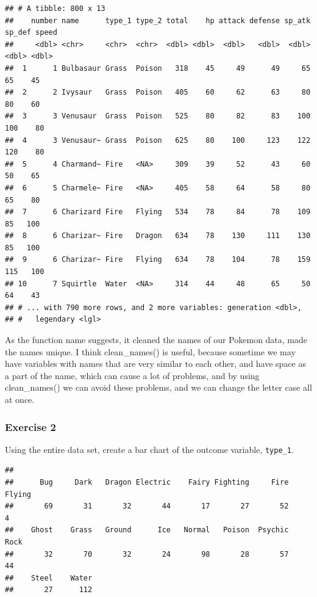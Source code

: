 \documentclass[
]{article}
\newenvironment{Shaded}{\begin{snugshade}}{\end{snugshade}}
\newcommand{\FunctionTok}[1]{\textcolor[rgb]{0.00,0.00,0.00}{#1}}
\newcommand{\NormalTok}[1]{#1}
\newcommand{\OtherTok}[1]{\textcolor[rgb]{0.56,0.35,0.01}{#1}}
\newcommand{\SpecialCharTok}[1]{\textcolor[rgb]{0.00,0.00,0.00}{#1}}
\begin{document}
\begin{verbatim}
## # A tibble: 800 x 13
##    number name      type_1 type_2 total    hp attack defense sp_atk sp_def speed
##     <dbl> <chr>     <chr>  <chr>  <dbl> <dbl>  <dbl>   <dbl>  <dbl>  <dbl> <dbl>
##  1      1 Bulbasaur Grass  Poison   318    45     49      49     65     65    45
##  2      2 Ivysaur   Grass  Poison   405    60     62      63     80     80    60
##  3      3 Venusaur  Grass  Poison   525    80     82      83    100    100    80
##  4      3 Venusaur~ Grass  Poison   625    80    100     123    122    120    80
##  5      4 Charmand~ Fire   <NA>     309    39     52      43     60     50    65
##  6      5 Charmele~ Fire   <NA>     405    58     64      58     80     65    80
##  7      6 Charizard Fire   Flying   534    78     84      78    109     85   100
##  8      6 Charizar~ Fire   Dragon   634    78    130     111    130     85   100
##  9      6 Charizar~ Fire   Flying   634    78    104      78    159    115   100
## 10      7 Squirtle  Water  <NA>     314    44     48      65     50     64    43
## # ... with 790 more rows, and 2 more variables: generation <dbl>,
## #   legendary <lgl>
\end{verbatim}

As the function name suggests, it cleaned the names of our Pokemon data,
made the names unique. I think clean\_names() is useful, because
sometime we may have variables with names that are very similar to each
other, and have space as a part of the name, which can cause a lot of
problems, and by using clean\_names() we can avoid these problems, and
we can change the letter case all at once.

\hypertarget{exercise-2}{%
\subsubsection{Exercise 2}\label{exercise-2}}

Using the entire data set, create a bar chart of the outcome variable,
\texttt{type\_1}.

\begin{Shaded}
\end{Shaded}

\begin{verbatim}
## 
##      Bug     Dark   Dragon Electric    Fairy Fighting     Fire   Flying 
##       69       31       32       44       17       27       52        4 
##    Ghost    Grass   Ground      Ice   Normal   Poison  Psychic     Rock 
##       32       70       32       24       98       28       57       44 
##    Steel    Water 
##       27      112
\end{verbatim}
\end{document}
